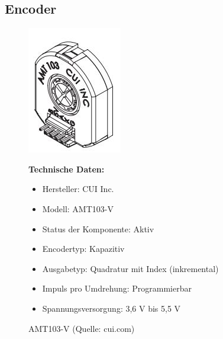 \subsection{Encoder}
\begin{figure}[htb]
	\centering
	\begin{minipage}{0.38\linewidth}
		\centering
		\includegraphics[scale=0.9]{images/Entcoder.jpg}
		\caption{AMT103-V  \newline (Quelle: cui.com)}
		\label{Endcoder}
	\end{minipage}
	\begin{minipage}[h]{0.6\textwidth}
		\textbf{Technische Daten:} 
		\begin{itemize} 
			\item Hersteller: CUI Inc.
			\item Modell:	AMT103-V
			\item Status der Komponente:	Aktiv
			\item Encodertyp:	Kapazitiv
			\item Ausgabetyp: Quadratur mit Index (inkremental)
			\item Impuls pro Umdrehung: Programmierbar
			\item Spannungsversorgung:	3,6 V bis 5,5 V
		\end{itemize}
	\end{minipage}
\end{figure}

